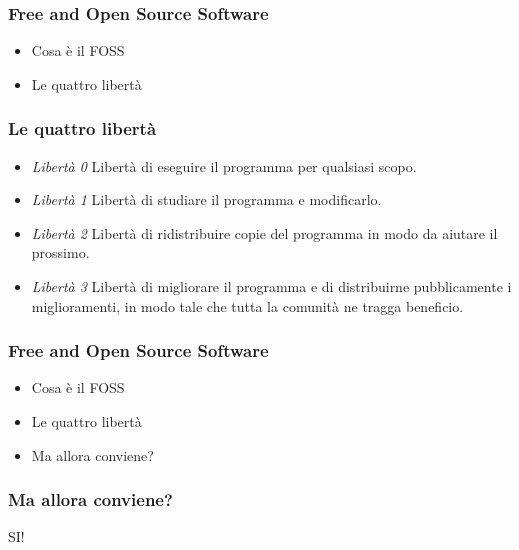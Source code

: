 \documentclass{beamer}
\begin{document}
\begin{frame}
  \frametitle{Free and Open Source Software}

  \begin{itemize}
    \item Cosa \`e il FOSS
    \item Le quattro libert\`a
  \end{itemize}

\end{frame}

\begin{frame}
  \frametitle{Le quattro libert\`a}

  \begin{itemize}
    \item<1-> \emph{Libert\`a 0} Libert\`a di eseguire il programma
      per qualsiasi scopo.
    \item<2-> \emph{Libert\`a 1} Libert\`a di studiare il programma e
      modificarlo.
    \item<3-> \emph{Libert\`a 2} Libert\`a di ridistribuire copie del
      programma in modo da aiutare il prossimo.
    \item<4-> \emph{Libert\`a 3} Libert\`a di migliorare il programma e di distribuirne pubblicamente i miglioramenti, in modo tale che tutta la comunit\`a ne tragga beneficio.
  \end{itemize}

\end{frame}

\begin{frame}
  \frametitle{Free and Open Source Software}

  \begin{itemize}
    \item Cosa \`e il FOSS
    \item Le quattro libert\`a
    \item Ma allora conviene?
  \end{itemize}

\end{frame}

\begin{frame}
  \frametitle{Ma allora conviene?}
  
  \begin{center}
    SI!
  \end{center}

\end{frame}
\end{document}
